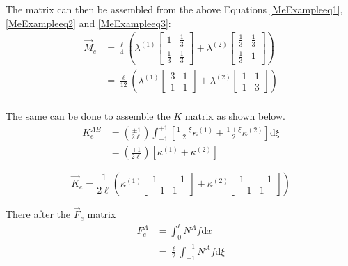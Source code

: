  The matrix can then be assembled from the above Equations \ref{MeExampleeq1},\ref{MeExampleeq2} and \ref{MeExampleeq3}:
\begin{equation}\label{Meassembled}
\begin{aligned}
\vec{M}_e &= \frac{\ell}{4} \left(
	\lambda^{(1)} \begin{bmatrix} 1 & \frac{1}{3} \\ \frac{1}{3} & \frac{1}{3} \end{bmatrix}
	+ \lambda^{(2)} \begin{bmatrix} \frac{1}{3} & \frac{1}{3} \\ \frac{1}{3} & 1 \end{bmatrix}
\right) \\
&= \frac{\ell}{12} \left(
	\lambda^{(1)} \begin{bmatrix} 3 & 1 \\ 1 & 1 \end{bmatrix}
	+ \lambda^{(2)} \begin{bmatrix} 1 & 1 \\ 1 & 3 \end{bmatrix}
\right) \\
\end{aligned}
\end{equation}

The same can be done to assemble the $K$ matrix as shown below.
\begin{equation}\label{Keass1}
\begin{aligned}
K_e^{AB} &= \left(\frac{\pm 1}{2\ell}\right) \int_{-1}^{+1} \left[
	\frac{1-\xi}{2} \kappa^{(1)}
	+ \frac{1+\xi}{2} \kappa^{(2)}
\right] \text{d}\xi \\
&= \left(\frac{\pm 1}{2\ell}\right) \left[ \kappa^{(1)} + \kappa^{(2)} \right]
\end{aligned}
\end{equation}


\begin{equation}\label{Keass2}
\vec{K}_e = \frac{1}{2\ell} \left(
	\kappa^{(1)} \begin{bmatrix} 1 & -1 \\ -1 & 1 \end{bmatrix}
	+ \kappa^{(2)} \begin{bmatrix} 1 & -1 \\ -1 & 1 \end{bmatrix}
\right)
\end{equation}

There after the $\vec{F}_e$ matrix
\begin{equation}\label{Keass3}
\begin{aligned}
F_e^A &= \int_0^\ell N^A f \text{d}x \\
&= \frac{\ell}{2} \int_{-1}^{+1} N^A f \text{d} \xi
\end{aligned}
\end{equation}


